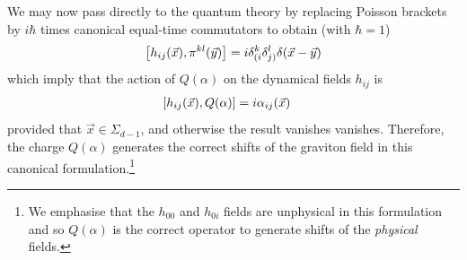 We may now pass directly to the quantum theory by replacing Poisson brackets by $i\hbar$ times canonical equal-time commutators to obtain (with $\hbar=1$)
\begin{equation}
    \comm{h_{ij}(\vec{x})}{\pi^{kl}(\vec{y})} = i \delta_{(i}^k\delta_{j)}^l \delta(\vec{x}-\vec{y}) 
\end{equation}
which imply that the action of $Q(\alpha)$ on the dynamical fields $h_{ij}$ is
\begin{align}
    \comm{h_{ij}(\vec{x})}{Q(\alpha)} &= i \alpha_{ij}(\vec{x})
\end{align}
provided that $\vec{x} \in \Sigma_{d-1}$, and otherwise the result vanishes vanishes. Therefore, the charge $Q(\alpha)$ generates the correct shifts of the graviton field in this canonical formulation.\footnote{We emphasise that the $h_{00}$ and $h_{0i}$ fields are unphysical in this formulation and so $Q(\alpha)$ is the correct operator to generate shifts of the \emph{physical} fields.}

